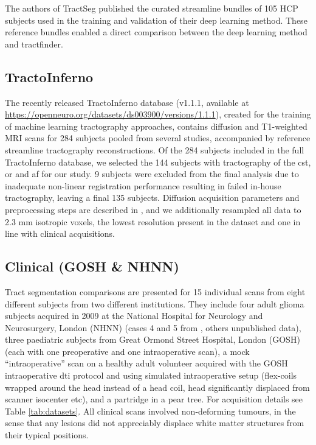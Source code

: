 The authors of TractSeg\autocite{Wasserthal2018} published the curated streamline bundles of 105 HCP subjects used in the training and validation of their deep learning method.
These reference bundles enabled a direct comparison between the deep learning method and tractfinder.

\subsection{TractoInferno}

The recently released TractoInferno database (v1.1.1, available at \url{https://openneuro.org/datasets/ds003900/versions/1.1.1}),\autocite{Poulin2022} created for the training of machine learning tractography approaches, contains diffusion and T1-weighted MRI scans for 284 subjects pooled from several studies, accompanied by reference streamline tractography reconstructions.
Of the 284 subjects included in the full TractoInferno database, we selected the 144 subjects with tractography of the \gls{cst}, \gls{or} and \gls{af} for our study.
9 subjects were excluded from the final analysis due to inadequate non-linear registration performance resulting in failed in-house tractography, leaving a final 135 subjects.
Diffusion acquisition parameters and preprocessing steps are described in \textcite{Poulin2022}, and we additionally resampled all data to 2.3 mm isotropic voxels, the lowest resolution present in the dataset and one in line with clinical acquisitions.

\subsection{Clinical (GOSH \& NHNN)}

Tract segmentation comparisons are presented for 15 individual scans from eight different subjects from two different institutions.
They include four adult glioma subjects acquired in 2009 at the National Hospital for Neurology and Neurosurgery, London (NHNN) (cases 4 and 5 from \textcite{Mancini2022}, others unpublished data),
three paediatric subjects from Great Ormond Street Hospital, London (GOSH) (each with one preoperative and one intraoperative scan),
a mock “intraoperative” scan on a healthy adult volunteer acquired with the GOSH intraoperative \gls{dti} protocol and using simulated intraoperative setup (flex-coils wrapped around the head instead of a head coil, head significantly displaced from scanner isocenter etc),
and a partridge in a pear tree.
For acquisition details see Table \ref{tab:datasets}.
All clinical scans involved non-deforming tumours, in the sense that any lesions did not appreciably displace white matter structures from their typical positions.

